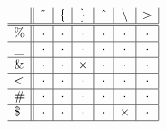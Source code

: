$
\begin{array}{l||*{6}{c|}}
& \textasciitilde & \{& \}& \textasciicircum & \textbackslash & \textgreater \\\hline\hline
\%& \cdot& \cdot& \cdot& \cdot& \cdot& \cdot\\\hline
\_& \cdot& \cdot& \cdot& \cdot& \cdot& \cdot\\\hline
\&& \cdot& \cdot& \times& \cdot& \cdot& \cdot\\\hline
\textless & \cdot& \cdot& \cdot& \cdot& \cdot& \cdot\\\hline
\#& \cdot& \cdot& \cdot& \cdot& \cdot& \cdot\\\hline
\$& \cdot& \cdot& \cdot& \cdot& \times& \cdot\\\hline
\end{array}
$
